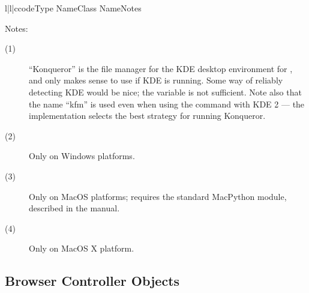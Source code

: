 \begin{tableiii}{l|l|c}{code}{Type Name}{Class Name}{Notes}
\end{tableiii}

\noindent
Notes:

\begin{description}
\item[(1)]
``Konqueror'' is the file manager for the KDE desktop environment for
\UNIX{}, and only makes sense to use if KDE is running.  Some way of
reliably detecting KDE would be nice; the  variable is
not sufficient.  Note also that the name ``kfm'' is used even when
using the  command with KDE 2 --- the
implementation selects the best strategy for running Konqueror.

\item[(2)]
Only on Windows platforms.

\item[(3)]
Only on MacOS platforms; requires the standard MacPython 
module, described in the  manual.

\item[(4)]
Only on MacOS X platform.
\end{description}


\subsection{Browser Controller Objects \label{browser-controllers}}

